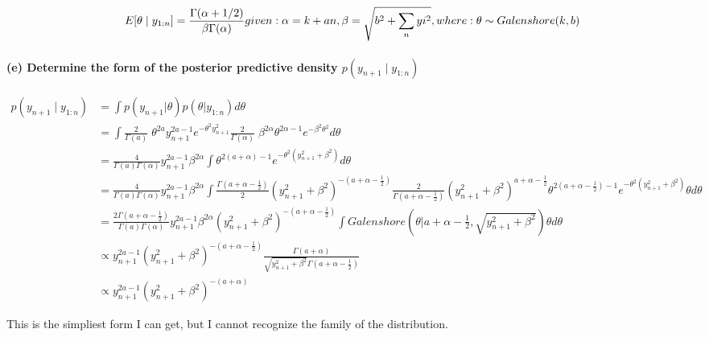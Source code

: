 \documentclass[]{article}
\let\oldparagraph\paragraph
\renewcommand{\paragraph}[1]{\oldparagraph{#1}\mbox{}}
\begin{document}
\[E[\theta \mid y_{1:n}] = \frac{\Gamma(\alpha +1/2)}{\beta \Gamma(\alpha)}\\
given: \alpha = k+an,\beta = \sqrt{b^2+\sum_n yi^2},\\
where: \theta \sim Galenshore(k, b)\]

\paragraph{\texorpdfstring{(e) Determine the form of the posterior
predictive density
\(p(y_{n+1} \mid y_{1:n})\)}{(e) Determine the form of the posterior predictive density p(y\_\{n+1\} \textbackslash{}mid y\_\{1:n\})}}\label{e-determine-the-form-of-the-posterior-predictive-density-py_n1-mid-y_1n}

\[\begin{align} p(y_{n+1} \mid y_{1:n}) &= \int p(y_{n+1} |\theta) p(\theta|y_{1:n})d\theta\\
&= \int \frac{2}{\Gamma(a)} \; \theta^{2a} y_{n+1}^{2a - 1} e^{-\theta^2 y_{n+1}^2}\frac{2}{\Gamma(\alpha)} \; \beta^{2\alpha} \theta^{2\alpha - 1} e^{-\beta^2 \theta^2}d\theta\\
&= \frac{4}{\Gamma(a)\Gamma{(\alpha)}}y_{n+1}^{2a - 1}\beta^{2\alpha} \int \theta^{2(a+\alpha)-1} e^{-\theta^2(y_{n+1}^2 + \beta^2)}d\theta\\
&= \frac{4}{\Gamma(a)\Gamma{(\alpha)}}y_{n+1}^{2a - 1}\beta^{2\alpha} \int \frac{\Gamma(a+\alpha-\frac{1}{2})}{2}(y_{n+1}^2 + \beta^2)^{-(a+\alpha-\frac{1}{2})}\frac{2}{\Gamma(a+\alpha-\frac{1}{2})}(y_{n+1}^2 + \beta^2)^{a+\alpha-\frac{1}{2}}\theta^{2(a+\alpha-\frac{1}{2})-1} e^{-\theta^2(y_{n+1}^2 + \beta^2)}\theta d\theta\\
&= \frac{2\Gamma(a+\alpha-\frac{1}{2})}{\Gamma(a)\Gamma{(\alpha)}}y_{n+1}^{2a - 1}\beta^{2\alpha}(y_{n+1}^2 + \beta^2)^{-(a+\alpha-\frac{1}{2})}\int Galenshore(\theta|a+\alpha-\frac{1}{2}, \sqrt{y_{n+1}^2 + \beta^2})\theta d\theta\\
&\propto y_{n+1}^{2a - 1}(y_{n+1}^2 + \beta^2)^{-(a+\alpha-\frac{1}{2})}\frac{\Gamma(a+\alpha)}{\sqrt{y_{n+1}^2 + \beta^2}\Gamma(a+\alpha-\frac{1}{2})}\\
&\propto y_{n+1}^{2a - 1}(y_{n+1}^2 + \beta^2)^{-(a+\alpha)}
\end{align}\]

This is the simpliest form I can get, but I cannot recognize the family
of the distribution.
\end{document}
